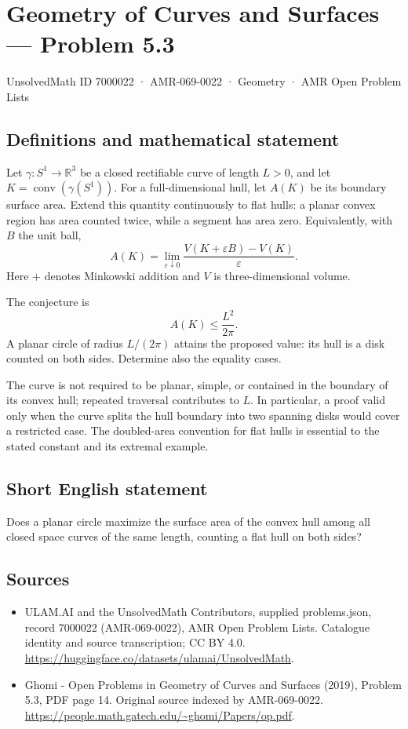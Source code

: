 \documentclass[11pt,a4paper]{article}
\begin{document}
\section*{Geometry of Curves and Surfaces — Problem 5.3}\label{7000022}
{\small UnsolvedMath ID 7000022 · AMR-069-0022 · Geometry · AMR Open Problem Lists}
\subsection{Definitions and mathematical statement}
Let $\gamma:S^1\to\mathbb R^3$ be a closed rectifiable curve of
length $L>0$, and let $K=\operatorname{conv}(\gamma(S^1))$.
For a full-dimensional hull, let $A(K)$ be its boundary surface
area. Extend this quantity continuously to flat hulls: a planar
convex region has area counted twice, while a segment has area
zero. Equivalently, with $B$ the unit ball,
\[
 A(K)=\lim_{\varepsilon\downarrow0}
       \frac{V(K+\varepsilon B)-V(K)}{\varepsilon}.
\]
Here $+$ denotes Minkowski addition and $V$ is three-dimensional
volume.

The conjecture is
\[
                              A(K)\le\frac{L^2}{2\pi}.
\]
A planar circle of radius $L/(2\pi)$ attains the proposed value:
its hull is a disk counted on both sides. Determine also the
equality cases.

The curve is not required to be planar, simple, or contained in
the boundary of its convex hull; repeated traversal contributes
to $L$. In particular, a proof valid only when the curve splits
the hull boundary into two spanning disks would cover a
restricted case. The doubled-area convention for flat hulls is
essential to the stated constant and its extremal example.
\subsection{Short English statement}
Does a planar circle maximize the surface area of the convex hull
among all closed space curves of the same length, counting a
flat hull on both sides?
\subsection{Sources}
\begin{itemize}
\item[S1] ULAM.AI and the UnsolvedMath Contributors, supplied problems.json, record 7000022 (AMR-069-0022), AMR Open Problem Lists. Catalogue identity and source transcription; CC BY 4.0.
\url{https://huggingface.co/datasets/ulamai/UnsolvedMath}.
\item[S2] Ghomi - Open Problems in Geometry of Curves and Surfaces (2019), Problem 5.3, PDF page 14. Original source indexed by AMR-069-0022.
\url{https://people.math.gatech.edu/~ghomi/Papers/op.pdf}.
\end{itemize}
\end{document}
